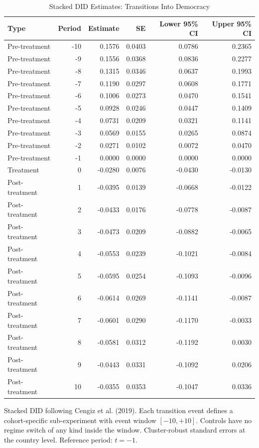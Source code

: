 \begin{table}[H]
\centering
\caption{\label{tab:stacked-in-table}Stacked DID Estimates: Transitions Into Democracy}
\centering
\fontsize{9}{11}\selectfont
\begin{threeparttable}
\begin{tabular}[t]{lrrrrr}
\toprule
Type & Period & Estimate & SE & Lower 95\% CI & Upper 95\% CI\\
\midrule
Pre-treatment & -10 & 0.1576 & 0.0403 & 0.0786 & 0.2365\\
Pre-treatment & -9 & 0.1556 & 0.0368 & 0.0836 & 0.2277\\
Pre-treatment & -8 & 0.1315 & 0.0346 & 0.0637 & 0.1993\\
Pre-treatment & -7 & 0.1190 & 0.0297 & 0.0608 & 0.1771\\
Pre-treatment & -6 & 0.1006 & 0.0273 & 0.0470 & 0.1541\\
\addlinespace
Pre-treatment & -5 & 0.0928 & 0.0246 & 0.0447 & 0.1409\\
Pre-treatment & -4 & 0.0731 & 0.0209 & 0.0321 & 0.1141\\
Pre-treatment & -3 & 0.0569 & 0.0155 & 0.0265 & 0.0874\\
Pre-treatment & -2 & 0.0271 & 0.0102 & 0.0072 & 0.0470\\
Pre-treatment & -1 & 0.0000 & 0.0000 & 0.0000 & 0.0000\\
\addlinespace
Treatment & 0 & -0.0280 & 0.0076 & -0.0430 & -0.0130\\
Post-treatment & 1 & -0.0395 & 0.0139 & -0.0668 & -0.0122\\
Post-treatment & 2 & -0.0433 & 0.0176 & -0.0778 & -0.0087\\
Post-treatment & 3 & -0.0473 & 0.0209 & -0.0882 & -0.0065\\
Post-treatment & 4 & -0.0553 & 0.0239 & -0.1021 & -0.0084\\
\addlinespace
Post-treatment & 5 & -0.0595 & 0.0254 & -0.1093 & -0.0096\\
Post-treatment & 6 & -0.0614 & 0.0269 & -0.1141 & -0.0087\\
Post-treatment & 7 & -0.0601 & 0.0290 & -0.1170 & -0.0033\\
Post-treatment & 8 & -0.0581 & 0.0312 & -0.1192 & 0.0030\\
Post-treatment & 9 & -0.0443 & 0.0331 & -0.1092 & 0.0206\\
\addlinespace
Post-treatment & 10 & -0.0355 & 0.0353 & -0.1047 & 0.0336\\
\bottomrule
\end{tabular}
\begin{tablenotes}
\item Stacked DID following Cengiz et al. (2019). Each transition event defines a cohort-specific sub-experiment with event window $[-10, +10]$. Controls have no regime switch of any kind inside the window. Cluster-robust standard errors at the country level. Reference period: $t = -1$.
\end{tablenotes}
\end{threeparttable}
\end{table}

